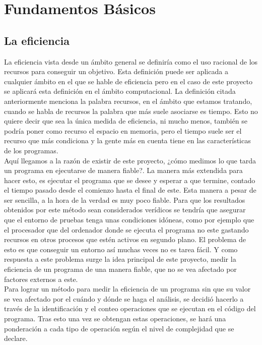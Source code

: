 

\section{Fundamentos Básicos}

\subsection{La eficiencia}

La eficiencia vista desde un ámbito general se definiría como el uso racional de los recursos para conseguir un objetivo. Esta definición puede ser aplicada a cualquier ámbito en el que se hable de eficiencia pero en el caso de este proyecto se aplicará esta definición en el ámbito computacional.
La definición citada anteriormente menciona la palabra recursos, en el ámbito que estamos tratando, cuando se habla de recursos la palabra que más suele asociarse es tiempo. Esto no quiere decir que sea la única medida de eficiencia, ni mucho menos, también se podría poner como recurso el espacio en memoria, pero el tiempo suele ser el recurso que más condiciona y la gente más en cuenta tiene en las características de los  programas.\\

Aquí llegamos a la razón de existir de este proyecto, ¿cómo medimos lo que tarda un programa en ejecutarse de manera fiable?. La manera más extendida para hacer esto, es ejecutar el programa que se desee y esperar a que termine, contado el tiempo pasado desde el comienzo hasta el final de este. Esta manera a pesar de ser sencilla, a la hora de la verdad es muy poco fiable. Para que los resultados obtenidos por este método sean considerados verídicos se tendría que asegurar que el entorno de pruebas tenga unas condiciones idóneas, como por ejemplo que el procesador que del ordenador donde se ejecuta el programa no este gastando recursos en otros procesos que estén activos en segundo plano. El problema de esto es que conseguir un entorno así muchas veces no es tarea fácil. Y como respuesta a este problema surge la idea principal de este proyecto, medir la eficiencia de un programa de una manera fiable, que no se vea afectado por factores externos a este.\\

Para lograr un método para medir la eficiencia de un programa sin que su valor se vea afectado por el cuándo y dónde se haga el análisis, se decidió hacerlo a través de la identificación y el conteo operaciones que se ejecutan en el código del programa. Tras esto una vez se obtengan estas operaciones, se hará una ponderación a cada tipo de operación según el nivel de complejidad que se declare. 

